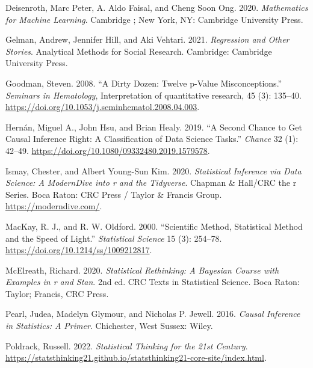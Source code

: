 \documentclass[
  letterpaper,
  DIV=11,
  numbers=noendperiod]{scrreprt}
\newlength{\cslhangindent}
\newlength{\cslentryspacingunit} %
\newenvironment{CSLReferences}[2] %
 {%
  \setlength{\parindent}{0pt}
  \ifodd #1
  \let\oldpar\par
  \def\par{\hangindent=\cslhangindent\oldpar}
  \fi
  \setlength{\parskip}{#2\cslentryspacingunit}
 }%
 {}
\theoremstyle{definition}
\theoremstyle{definition}
\theoremstyle{remark}
\begin{document}
\hypertarget{refs}{}
\begin{CSLReferences}{1}{0}
\leavevmode{}%
Deisenroth, Marc Peter, A. Aldo Faisal, and Cheng Soon Ong. 2020.
\emph{Mathematics for Machine Learning}. Cambridge ; New York, {NY}:
Cambridge University Press.

\leavevmode{}%
Gelman, Andrew, Jennifer Hill, and Aki Vehtari. 2021. \emph{Regression
and Other Stories}. Analytical Methods for Social Research. Cambridge:
Cambridge University Press.

\leavevmode{}%
Goodman, Steven. 2008. {``A Dirty Dozen: Twelve p-Value
Misconceptions.''} \emph{Seminars in Hematology}, Interpretation of
quantitative research, 45 (3): 135--40.
\url{https://doi.org/10.1053/j.seminhematol.2008.04.003}.

\leavevmode{}%
Hernán, Miguel A., John Hsu, and Brian Healy. 2019. {``A Second Chance
to Get Causal Inference Right: A Classification of Data Science
Tasks.''} \emph{Chance} 32 (1): 42--49.
\url{https://doi.org/10.1080/09332480.2019.1579578}.

\leavevmode{}%
Ismay, Chester, and Albert Young-Sun Kim. 2020. \emph{Statistical
Inference via Data Science: A {ModernDive} into r and the Tidyverse}.
Chapman \& Hall/{CRC} the r Series. Boca Raton: {CRC} Press / Taylor \&
Francis Group. \url{https://moderndive.com/}.

\leavevmode{}%
MacKay, R. J., and R. W. Oldford. 2000. {``Scientific Method,
Statistical Method and the Speed of Light.''} \emph{Statistical Science}
15 (3): 254--78. \url{https://doi.org/10.1214/ss/1009212817}.

\leavevmode{}%
McElreath, Richard. 2020. \emph{Statistical Rethinking: A Bayesian
Course with Examples in r and Stan}. 2nd ed. {CRC} Texts in Statistical
Science. Boca Raton: Taylor; Francis, {CRC} Press.

\leavevmode{}%
Pearl, Judea, Madelyn Glymour, and Nicholas P. Jewell. 2016.
\emph{Causal Inference in Statistics: A Primer}. Chichester, West
Sussex: Wiley.

\leavevmode{}%
Poldrack, Russell. 2022. \emph{Statistical Thinking for the 21st
Century}.
\url{https://statsthinking21.github.io/statsthinking21-core-site/index.html}.


\end{CSLReferences}
\end{document}
